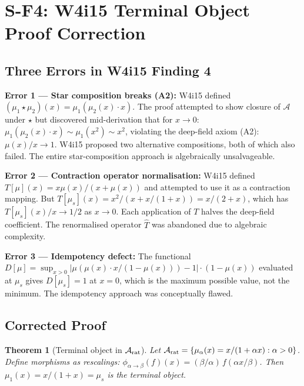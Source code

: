 \documentclass[11pt]{article}
\newtheorem{theorem}{Theorem}[section]
\theoremstyle{definition}
\theoremstyle{remark}
\begin{document}
\section{S-F4: W4i15 Terminal Object Proof Correction}
\label{sec:terminal}

\subsection{Three Errors in W4i15 Finding 4}

\textbf{Error 1 --- Star composition breaks (A2):}
W4i15 defined $(\mu_1 \star \mu_2)(x) = \mu_1(\mu_2(x)\cdot x)$.
The proof attempted to show closure of $\mathcal{A}$ under $\star$
but discovered mid-derivation that for $x \to 0$:
$\mu_1(\mu_2(x)\cdot x) \sim \mu_1(x^2) \sim x^2$, violating the
deep-field axiom (A2): $\mu(x)/x \to 1$.
W4i15 proposed two alternative compositions, both of which also failed.
The entire star-composition approach is algebraically unsalvageable.

\textbf{Error 2 --- Contraction operator normalisation:}
W4i15 defined $T[\mu](x) = x\mu(x)/(x+\mu(x))$ and attempted to use
it as a contraction mapping. But $T[\mu_s](x) = x^2/(x+x/(1+x))
= x/(2+x)$, which has $T[\mu_s](x)/x \to 1/2$ as $x \to 0$. Each
application of $T$ halves the deep-field coefficient. The renormalised
operator $\hat{T}$ was abandoned due to algebraic complexity.

\textbf{Error 3 --- Idempotency defect:}
The functional $D[\mu] = \sup_{x>0}|\mu(\mu(x)\cdot x/(1-\mu(x)))-1|
\cdot(1-\mu(x))$ evaluated at $\mu_s$ gives $D[\mu_s] = 1$ at $x=0$,
which is the maximum possible value, not the minimum. The idempotency
approach was conceptually flawed.

\subsection{Corrected Proof}

\begin{theorem}[Terminal object in $\mathcal{A}_{\rm rat}$]
\label{thm:terminal-corrected}
Let $\mathcal{A}_{\rm rat} = \{\mu_\alpha(x) = x/(1+\alpha x) :
\alpha > 0\}$. Define morphisms as rescalings:
$\phi_{\alpha\to\beta}(f)(x) = (\beta/\alpha)\,f(\alpha x/\beta)$.
Then $\mu_1(x) = x/(1+x) = \mu_s$ is the terminal object.
\end{theorem}
\end{document}
